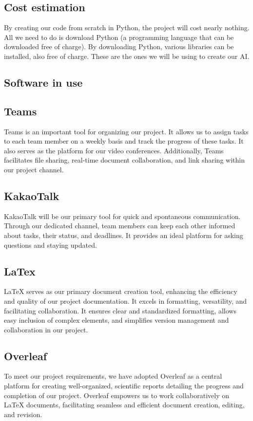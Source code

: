\documentclass[conference]{IEEEtran}
\begin{document}
\subsection*{Cost estimation }
By creating our code from scratch in Python, the project will cost nearly nothing. All we need to do is download Python (a programming language that can be downloaded free of charge). By downloading Python, various libraries can be installed, also free of charge. These are the ones we will be using to create our AI.


\subsection{Software in use}

\subsection*{Teams}
Teams is an important tool for organizing our project. It allows us to assign tasks to each team member on a weekly basis and track the progress of these tasks. It also serves as the platform for our video conferences. Additionally, Teams facilitates file sharing, real-time document collaboration, and link sharing within our project channel.
\subsection*{KakaoTalk}
KakaoTalk will be our primary tool for quick and spontaneous communication. Through our dedicated channel, team members can keep each other informed about tasks, their status, and deadlines. It provides an ideal platform for asking questions and staying updated.
\subsection*{LaTex}
LaTeX serves as our primary document creation tool, enhancing the efficiency and quality of our project documentation. It excels in formatting, versatility, and facilitating collaboration. It ensures clear and standardized formatting, allows easy inclusion of complex elements, and simplifies version management and collaboration in our project.
\subsection*{Overleaf}
To meet our project requirements, we have adopted Overleaf as a central platform for creating well-organized, scientific reports detailing the progress and completion of our project. Overleaf empowers us to work collaboratively on LaTeX documents, facilitating seamless and efficient document creation, editing, and revision.
\end{document}
